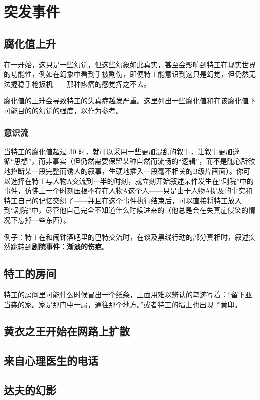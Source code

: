 \chapter{突发事件}

\section{腐化值上升}

在一开始，这只是一些幻觉，但这些幻象如此真实，甚至会影响到特工在现实世界的功能性，例如在幻象中看到手被割伤，即便特工能意识到这只是幻觉，但仍然无法握稳手枪扳机——那种疼痛的感觉挥之不去。

腐化值的上升会导致特工的失真症越发严重。这里列出一些腐化值和在该腐化值下可能目的的幻觉的强度，以作为参考。

\subsection{意识流}

当特工的腐化值超过 30 时，就可以采用一些更加混乱的叙事，让叙事更加遵循“思想”，而非事实（但仍然需要保留某种自然而流畅的“逻辑”，而不是随心所欲地掐断某一段完整而诱人的叙事，生硬地插入一段毫不相关的B级片画面）。你可以选择在特工与人物A交流到一半的时刻，就立刻开始叙述某件发生在“剧院”中的事件，仿佛上一个时刻压根不存在人物A这个人——只是由于人物A提及的事实和特工自己的记忆交织了——并且在这个事件执行结束后，可以直接将特工放入到“剧院”中，尽管他自己完全不知道什么时候进来的（他总是会在失真症侵染的情况下忘掉一些东西）。

例子：特工在和闹钟酒吧里的巴特交流时，在谈及黑线行动的部分真相时，叙述突然跳转到\textbf{剧院事件：渐淡的伤疤}。

\section{特工的房间}
特工的房间里可能什么时候冒出一个纸条，上面用难以辨认的笔迹写着：“留下亚当森的家。家是那门中一扇，通往那个地方。”或者特工的墙上也出现了黄印。

\section{黄衣之王开始在网路上扩散}

\section{来自心理医生的电话}

\section{达夫的幻影}

